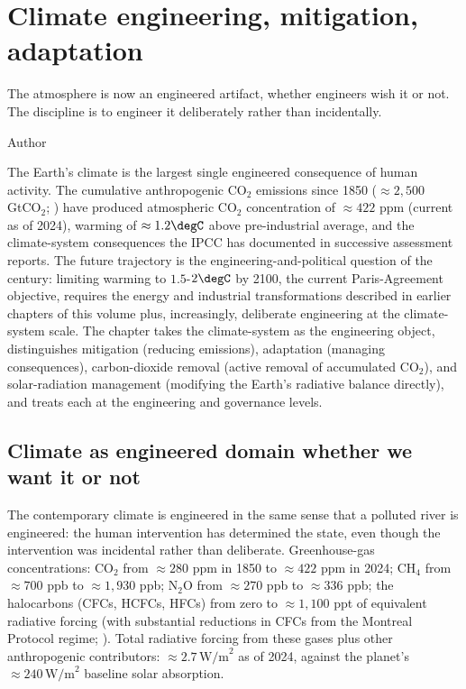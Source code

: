 \chapter{Climate engineering, mitigation, adaptation}
\label{vol12:ch11}

\epigraph{The atmosphere is now an engineered artifact, whether engineers wish it or not. The discipline is to engineer it deliberately rather than incidentally.}{Author}


\noindent
The Earth's climate is the largest single engineered consequence of human activity. The cumulative anthropogenic CO$_2$ emissions since 1850 ($\approx 2{,}500$ GtCO$_2$; \cite{std:ipcc-ar6-wg1-2021}) have produced atmospheric CO$_2$ concentration of $\approx 422$ ppm (current as of 2024), warming of $\approx 1.2\degC$ above pre-industrial average, and the climate-system consequences the IPCC has documented in successive assessment reports. The future trajectory is the engineering-and-political question of the century: limiting warming to $1.5$-$2\degC$ by 2100, the current Paris-Agreement objective, requires the energy and industrial transformations described in earlier chapters of this volume plus, increasingly, deliberate engineering at the climate-system scale. The chapter takes the climate-system as the engineering object, distinguishes mitigation (reducing emissions), adaptation (managing consequences), carbon-dioxide removal (active removal of accumulated CO$_2$), and solar-radiation management (modifying the Earth's radiative balance directly), and treats each at the engineering and governance levels.

\section{Climate as engineered domain whether we want it or not}

The contemporary climate is engineered in the same sense that a polluted river is engineered: the human intervention has determined the state, even though the intervention was incidental rather than deliberate. Greenhouse-gas concentrations: CO$_2$ from $\approx 280$ ppm in 1850 to $\approx 422$ ppm in 2024; CH$_4$ from $\approx 700$ ppb to $\approx 1{,}930$ ppb; N$_2$O from $\approx 270$ ppb to $\approx 336$ ppb; the halocarbons (CFCs, HCFCs, HFCs) from zero to $\approx 1{,}100$ ppt of equivalent radiative forcing (with substantial reductions in CFCs from the Montreal Protocol regime; \cite{law:montreal-protocol-1987}). Total radiative forcing from these gases plus other anthropogenic contributors: $\approx 2.7\,\text{W/m}^2$ as of 2024, against the planet's $\approx 240\,\text{W/m}^2$ baseline solar absorption.


